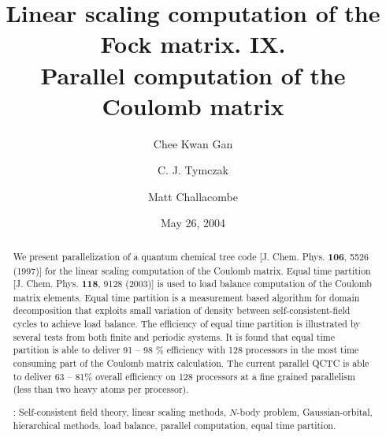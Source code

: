 \commentoutA{\documentclass[prl,aps,twocolumn,twocolumngrid,superbib]{revtex4}}
\begin{document}
\title[Short Title]{
Linear scaling computation of the Fock matrix. IX. \\
Parallel computation of the Coulomb matrix\footnotemark[1]}

\author{Chee Kwan Gan\footnotemark[2]}
\author{C. J. Tymczak\footnotemark[3]}
\author{Matt Challacombe\footnotemark[4]}


\date{May 26, 2004}

\begin{abstract}
We present parallelization of a quantum chemical tree code
[J. Chem. Phys. {\bf 106}, 5526 (1997)] for the linear scaling
computation of the Coulomb matrix.  Equal time partition
[J. Chem. Phys. {\bf 118}, 9128 (2003)] is used to load balance
computation of the Coulomb matrix elements.  Equal time partition is a
measurement based algorithm for domain decomposition that exploits
small variation of density between self-consistent-field cycles to
achieve load balance. The efficiency of equal time partition is
illustrated by several tests from both finite and periodic systems.
It is found that equal time partition is able to deliver 91 -- 98 \%
efficiency with 128 processors in the most time consuming part of the
Coulomb matrix calculation.  The current parallel QCTC is able to
deliver 63 -- 81\% overall efficiency on 128 processors at a fine
grained parallelism (less than two heavy atoms per processor).


\smallskip
{}:
Self-consistent field theory, linear scaling methods, $N$-body problem,
Gaussian-orbital, hierarchical methods, load balance, parallel computation,
equal time partition.
\end{abstract}
\maketitle
\end{document}
